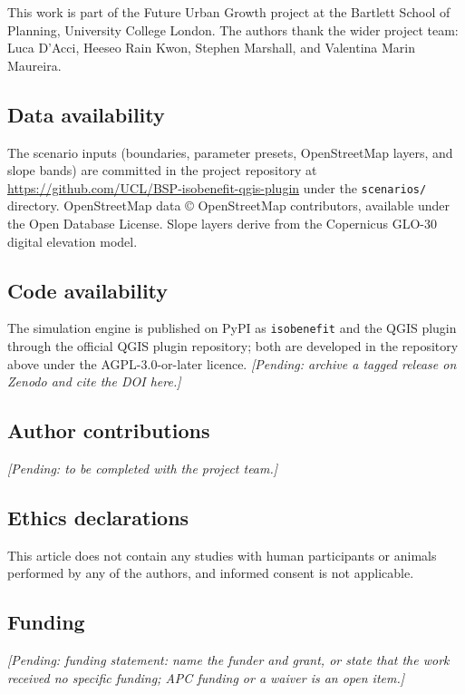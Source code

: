 \documentclass[11pt]{article}
\newcommand{\pending}[1]{\textit{[Pending: #1]}}
\begin{document}
This work is part of the Future Urban Growth project at the Bartlett School
of Planning, University College London. The authors thank the wider project
team: Luca D'Acci, Heeseo Rain Kwon, Stephen Marshall, and Valentina Marin
Maureira.

\subsection*{Data availability}

The scenario inputs (boundaries, parameter presets, OpenStreetMap layers,
and slope bands) are committed in the project repository at
\url{https://github.com/UCL/BSP-isobenefit-qgis-plugin} under the
\texttt{scenarios/} directory. OpenStreetMap data \copyright{}
OpenStreetMap contributors, available under the Open Database License.
Slope layers derive from the Copernicus GLO-30 digital elevation model.

\subsection*{Code availability}

The simulation engine is published on PyPI as \texttt{isobenefit} and the
QGIS plugin through the official QGIS plugin repository; both are developed
in the repository above under the AGPL-3.0-or-later licence.
\pending{archive a tagged release on Zenodo and cite the DOI here.}

\subsection*{Author contributions}

\pending{to be completed with the project team.}

\subsection*{Ethics declarations}

This article does not contain any studies with human participants or
animals performed by any of the authors, and informed consent is not
applicable.

\subsection*{Funding}

\pending{funding statement: name the funder and grant, or state that
  the work received no specific funding; APC funding or a waiver is an
open item.}
\end{document}

